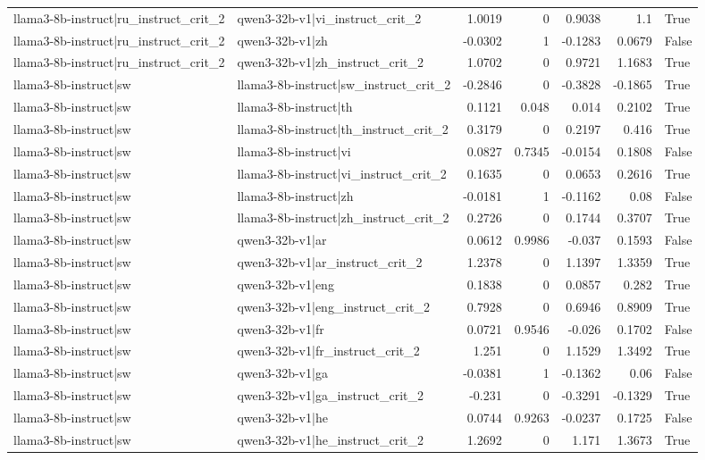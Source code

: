 \begin{table}
\begin{tabular}{l l r r r r l}
llama3-8b-instruct|ru_instruct_crit_2 & qwen3-32b-v1|vi_instruct_crit_2 & 1.0019 & 0 & 0.9038 & 1.1 & True \\
llama3-8b-instruct|ru_instruct_crit_2 & qwen3-32b-v1|zh & -0.0302 & 1 & -0.1283 & 0.0679 & False \\
llama3-8b-instruct|ru_instruct_crit_2 & qwen3-32b-v1|zh_instruct_crit_2 & 1.0702 & 0 & 0.9721 & 1.1683 & True \\
llama3-8b-instruct|sw & llama3-8b-instruct|sw_instruct_crit_2 & -0.2846 & 0 & -0.3828 & -0.1865 & True \\
llama3-8b-instruct|sw & llama3-8b-instruct|th & 0.1121 & 0.048 & 0.014 & 0.2102 & True \\
llama3-8b-instruct|sw & llama3-8b-instruct|th_instruct_crit_2 & 0.3179 & 0 & 0.2197 & 0.416 & True \\
llama3-8b-instruct|sw & llama3-8b-instruct|vi & 0.0827 & 0.7345 & -0.0154 & 0.1808 & False \\
llama3-8b-instruct|sw & llama3-8b-instruct|vi_instruct_crit_2 & 0.1635 & 0 & 0.0653 & 0.2616 & True \\
llama3-8b-instruct|sw & llama3-8b-instruct|zh & -0.0181 & 1 & -0.1162 & 0.08 & False \\
llama3-8b-instruct|sw & llama3-8b-instruct|zh_instruct_crit_2 & 0.2726 & 0 & 0.1744 & 0.3707 & True \\
llama3-8b-instruct|sw & qwen3-32b-v1|ar & 0.0612 & 0.9986 & -0.037 & 0.1593 & False \\
llama3-8b-instruct|sw & qwen3-32b-v1|ar_instruct_crit_2 & 1.2378 & 0 & 1.1397 & 1.3359 & True \\
llama3-8b-instruct|sw & qwen3-32b-v1|eng & 0.1838 & 0 & 0.0857 & 0.282 & True \\
llama3-8b-instruct|sw & qwen3-32b-v1|eng_instruct_crit_2 & 0.7928 & 0 & 0.6946 & 0.8909 & True \\
llama3-8b-instruct|sw & qwen3-32b-v1|fr & 0.0721 & 0.9546 & -0.026 & 0.1702 & False \\
llama3-8b-instruct|sw & qwen3-32b-v1|fr_instruct_crit_2 & 1.251 & 0 & 1.1529 & 1.3492 & True \\
llama3-8b-instruct|sw & qwen3-32b-v1|ga & -0.0381 & 1 & -0.1362 & 0.06 & False \\
llama3-8b-instruct|sw & qwen3-32b-v1|ga_instruct_crit_2 & -0.231 & 0 & -0.3291 & -0.1329 & True \\
llama3-8b-instruct|sw & qwen3-32b-v1|he & 0.0744 & 0.9263 & -0.0237 & 0.1725 & False \\
llama3-8b-instruct|sw & qwen3-32b-v1|he_instruct_crit_2 & 1.2692 & 0 & 1.171 & 1.3673 & True \\

\end{tabular}
\end{table}
